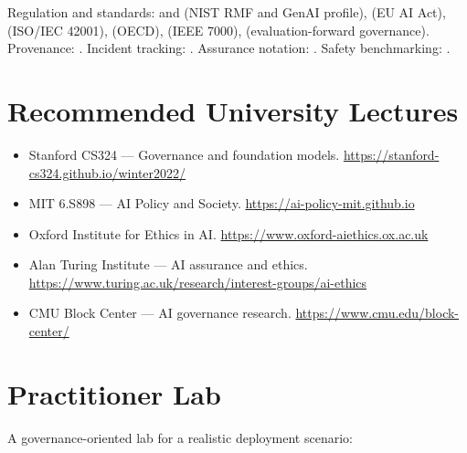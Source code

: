 Regulation and standards: \citet{nist2023airmf} and
\citet{nist2024genai_profile} (NIST RMF and GenAI profile),
\citet{eu_aiact_2024} (EU AI Act), \citet{iso42001_2023} (ISO/IEC
42001), \citet{oecd_ai_principles} (OECD), \citet{ieee_7000}
(IEEE 7000), \citet{uk_aisi_2024, singapore_aiverify_2024}
(evaluation-forward governance). Provenance:
\citet{c2pa}. Incident tracking: \citet{aiid}. Assurance
notation: \citet{gsn2021}. Safety benchmarking:
\citet{mlcommons_ailuminate}.

\section{Recommended University Lectures}

\begin{itemize}
  \item Stanford CS324 --- Governance and foundation models.
        \url{https://stanford-cs324.github.io/winter2022/}
  \item MIT 6.S898 --- AI Policy and Society.
        \url{https://ai-policy-mit.github.io}
  \item Oxford Institute for Ethics in AI.
        \url{https://www.oxford-aiethics.ox.ac.uk}
  \item Alan Turing Institute --- AI assurance and ethics.
        \url{https://www.turing.ac.uk/research/interest-groups/ai-ethics}
  \item CMU Block Center --- AI governance research.
        \url{https://www.cmu.edu/block-center/}
\end{itemize}

\section{Practitioner Lab}

A governance-oriented lab for a realistic deployment scenario:

